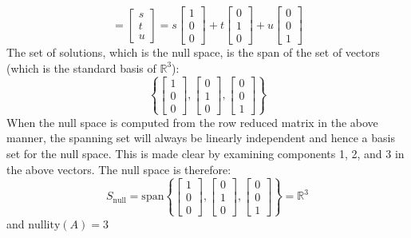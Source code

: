 \documentclass{article}
\begin{document}
\begin{itemize}
\[= \begin{bmatrix} s \\ t \\ u \end{bmatrix} 
= s\begin{bmatrix} 1 \\ 0 \\ 0 \end{bmatrix} + t\begin{bmatrix} 0 \\ 1 \\ 0 \end{bmatrix} + u\begin{bmatrix} 0 \\ 0 \\ 1 \end{bmatrix}\]
The set of solutions, which is the null space, is the span of the set of vectors (which is the standard basis of \(\mathbb{R}^3\)):
\[\left\{\begin{bmatrix} 1 \\ 0 \\ 0 \end{bmatrix}, \begin{bmatrix} 0 \\ 1 \\ 0 \end{bmatrix}, \begin{bmatrix} 0 \\ 0 \\ 1 \end{bmatrix}\right\}\]
When the null space is computed from the row reduced matrix in the above manner, the spanning set will always be linearly independent and hence a basis set for the null space. This is made clear by examining components 1, 2, and 3 in the above vectors. The null space is therefore:
\[S_{\text{null}} = \text{span}\left\{\begin{bmatrix} 1 \\ 0 \\ 0 \end{bmatrix}, \begin{bmatrix} 0 \\ 1 \\ 0 \end{bmatrix}, \begin{bmatrix} 0 \\ 0 \\ 1 \end{bmatrix}\right\} = \mathbb{R}^3\]
and \(\text{nullity}(A) = 3\)
\end{itemize}
\end{document}

